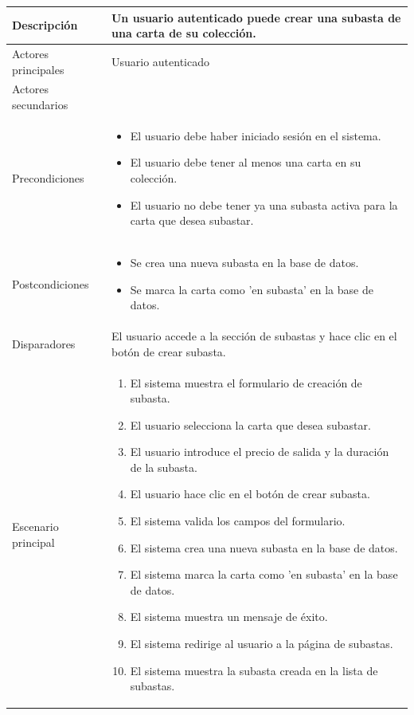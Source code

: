 \begin{longtable}{
    >{\columncolor{lightgreen!20}}p{4cm}
    p{12cm}
    }
    \midrule
    Descripción & Un usuario autenticado puede crear una subasta de una carta de su colección. \\
    \midrule
    Actores principales & Usuario autenticado \\
    \midrule
    Actores secundarios &  \\
    \midrule
    Precondiciones & \begin{itemize}[nosep,leftmargin=*]
        \item El usuario debe haber iniciado sesión en el sistema.
        \item El usuario debe tener al menos una carta en su colección.
        \item El usuario no debe tener ya una subasta activa para la carta que desea subastar.
    \end{itemize} \\
    \midrule
    Postcondiciones & \begin{itemize}[nosep,leftmargin=*]
        \item Se crea una nueva subasta en la base de datos.
        \item Se marca la carta como 'en subasta' en la base de datos.
    \end{itemize} \\
    \midrule
    Disparadores & El usuario accede a la sección de subastas y hace clic en el botón de crear subasta. \\
    \midrule
    Escenario principal & \begin{enumerate}[nosep,leftmargin=*]
        \item El sistema muestra el formulario de creación de subasta.
        \item El usuario selecciona la carta que desea subastar.
        \item El usuario introduce el precio de salida y la duración de la subasta.
        \item El usuario hace clic en el botón de crear subasta.
        \item El sistema valida los campos del formulario.
        \item El sistema crea una nueva subasta en la base de datos.
        \item El sistema marca la carta como 'en subasta' en la base de datos.
        \item El sistema muestra un mensaje de éxito.
        \item El sistema redirige al usuario a la página de subastas.
        \item El sistema muestra la subasta creada en la lista de subastas.

\end{enumerate}
\end{longtable}
